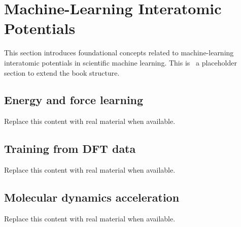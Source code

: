\section{Machine-Learning Interatomic Potentials}
This section introduces foundational concepts related to machine-learning interatomic potentials in scientific machine learning. This is~\cite{abdulmaksoudTransformerBasedSensorFusion2025} a placeholder section to extend the book structure.

\subsection{Energy and force learning}
Replace this content with real material when available.

\subsection{Training from DFT data}
Replace this content with real material when available.

\subsection{Molecular dynamics acceleration}
Replace this content with real material when available.
